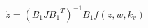 
\begin{equation}
   \dot{z}  = (B_1 J {B_1}^T)^{-1}B_1 f(z, w, k_v)
   \label{ParatModelFinal}
 \end{equation}


